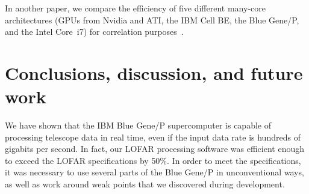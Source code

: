 \documentclass{sig-alternate}
\begin{document}
In another paper, we compare the efficiency of five different many-core
architectures (GPUs from Nvidia and ATI, the IBM Cell BE, the Blue Gene/P,
and the Intel Core~i7) for correlation purposes~\cite{Nieuwpoort:09}.





\section{Conclusions, discussion, and future work}

We have shown that the IBM Blue Gene/P supercomputer is capable of processing telescope data in real time,
even if the input data rate is hundreds of gigabits per second. In fact, our LOFAR processing software was efficient enough to exceed the LOFAR specifications by 50\%. In order to meet the specifications, it was necessary to use several parts of the Blue Gene/P in unconventional ways, as well as work around weak points that we discovered during development.
\end{document}
